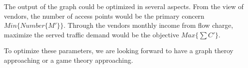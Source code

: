 The output of the graph could be optimized in several aspects. From the view of vendors,
the number of access points would be the primary concern $Min{\{Number\{M'\}\}}$.
Through the vendors monthly income from flow charge, maximize the served traffic
demand would be the objective $Max{\{\sum{C'}\}}$. 

To optimize these parameters, we are looking forward to have a graph theroy 
approaching or a game theory approaching.


